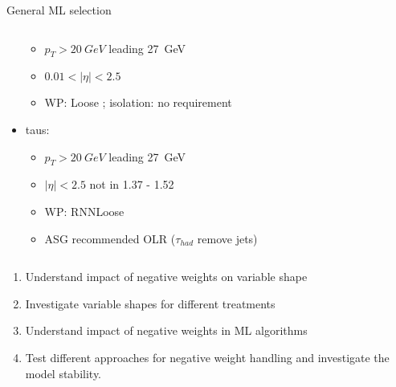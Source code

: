 \begin{frame}{General ML selection}
\begin{columns}
\begin{column}{0.7\textwidth}
\begin{itemize}
\begin{itemize}
          \footnotesize
          \item $p_T>\SI{20}{GeV}$ leading \SI{27}{GeV}
          \item $0.01<|\eta|<2.5$
          \item WP: Loose ; isolation: no requirement
        \end{itemize}
        \item taus:
        \vspace*{-0.02\textwidth}
        \begin{itemize}
          \footnotesize
          \item $p_T>\SI{20}{GeV}$ leading \SI{27}{GeV}
          \item $|\eta|<2.5$ not in 1.37 - 1.52
          \item WP: RNNLoose
          \item ASG recommended OLR ($\tau_{had}$ remove jets)
        \end{itemize}
      \end{itemize}
    \end{column}
  \end{columns}
\end{frame}

\begin{frame}
    \begin{enumerate}
        \item Understand impact of negative weights on variable shape
        \item Investigate variable shapes for different treatments
        \item Understand impact of negative weights in ML algorithms
        \item Test different approaches for negative weight handling and investigate the model stability.
    \end{enumerate}
\end{frame}
